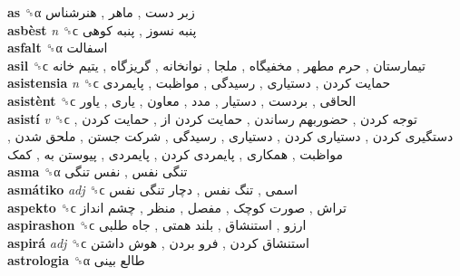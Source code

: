 \textbf{as} ␝α   زبر دست ,  ماهر ,  هنرشناس   \\
\textbf{asbèst} \emph{n}  ␝ϲ   پنبه نسوز ,  پنبه کوهی   \\
\textbf{asfalt} ␝α   اسفالت   \\
\textbf{asil} ␝ϲ   تیمارستان ,  حرم مطهر ,  مخفیگاه ,  ملجا ,  نوانخانه ,  گریزگاه ,  یتیم خانه   \\
\textbf{asistensia} \emph{n}  ␝ϲ   حمایت کردن ,  دستیاری ,  رسیدگی ,  مواظبت ,  پایمردی   \\
\textbf{asistènt} ␝ϲ   الحاقی ,  بردست ,  دستیار ,  مدد ,  معاون ,  یاری ,  یاور   \\
\textbf{asistí} \emph{v}  ␝ϲ   توجه کردن ,  حضوربهم رساندن ,  حمایت کردن از ,  حمایت کردن ,  دستگیری کردن ,  دستیاری کردن ,  دستیاری ,  رسیدگی ,  شرکت جستن ,  ملحق شدن ,  مواظبت ,  همکاری ,  پایمردی کردن ,  پایمردی ,  پیوستن به ,  کمک   \\
\textbf{asma} ␝α   تنگی نفس ,  نفس تنگی   \\
\textbf{asmátiko} \emph{adj}  ␝ϲ   اسمی ,  تنگ نفس ,  دچار تنگی نفس   \\
\textbf{aspekto} ␝ϲ   تراش ,  صورت کوچک ,  مفصل ,  منظر ,  چشم انداز   \\
\textbf{aspirashon} ␝ϲ   ارزو ,  استنشاق ,  بلند همتی ,  جاه طلبی   \\
\textbf{aspirá} \emph{adj}  ␝ϲ   استنشاق کردن ,  فرو بردن ,  هوش داشتن   \\
\textbf{astrologia} ␝α   طالع بینی   \\
